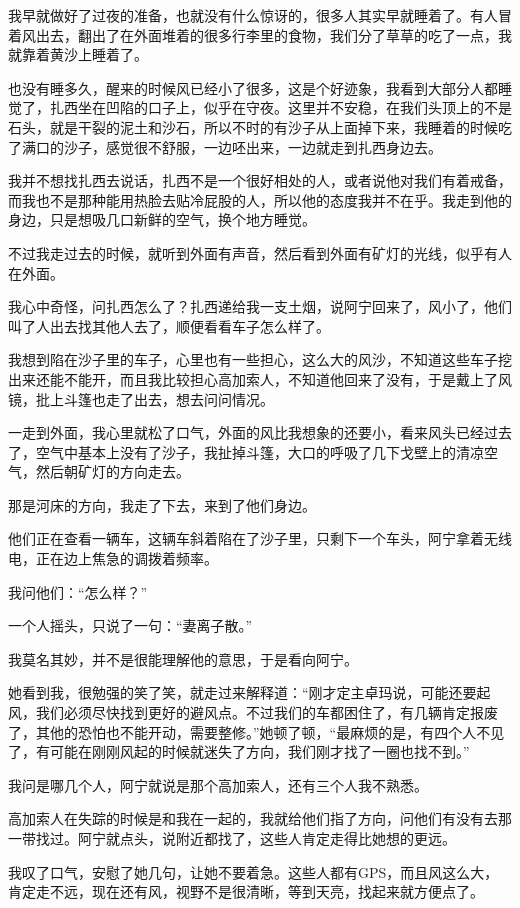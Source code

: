 我早就做好了过夜的准备，也就没有什么惊讶的，很多人其实早就睡着了。有人冒着风出去，翻出了在外面堆着的很多行李里的食物，我们分了草草的吃了一点，我就靠着黄沙上睡着了。

也没有睡多久，醒来的时候风已经小了很多，这是个好迹象，我看到大部分人都睡觉了，扎西坐在凹陷的口子上，似乎在守夜。这里并不安稳，在我们头顶上的不是石头，就是干裂的泥土和沙石，所以不时的有沙子从上面掉下来，我睡着的时候吃了满口的沙子，感觉很不舒服，一边呸出来，一边就走到扎西身边去。

我并不想找扎西去说话，扎西不是一个很好相处的人，或者说他对我们有着戒备，而我也不是那种能用热脸去贴冷屁股的人，所以他的态度我并不在乎。我走到他的身边，只是想吸几口新鲜的空气，换个地方睡觉。

不过我走过去的时候，就听到外面有声音，然后看到外面有矿灯的光线，似乎有人在外面。

我心中奇怪，问扎西怎么了？扎西递给我一支土烟，说阿宁回来了，风小了，他们叫了人出去找其他人去了，顺便看看车子怎么样了。

我想到陷在沙子里的车子，心里也有一些担心，这么大的风沙，不知道这些车子挖出来还能不能开，而且我比较担心高加索人，不知道他回来了没有，于是戴上了风镜，批上斗篷也走了出去，想去问问情况。

一走到外面，我心里就松了口气，外面的风比我想象的还要小，看来风头已经过去了，空气中基本上没有了沙子，我扯掉斗篷，大口的呼吸了几下戈壁上的清凉空气，然后朝矿灯的方向走去。

那是河床的方向，我走了下去，来到了他们身边。

他们正在查看一辆车，这辆车斜着陷在了沙子里，只剩下一个车头，阿宁拿着无线电，正在边上焦急的调拨着频率。

我问他们：“怎么样？”

一个人摇头，只说了一句：“妻离子散。”

我莫名其妙，并不是很能理解他的意思，于是看向阿宁。

她看到我，很勉强的笑了笑，就走过来解释道：“刚才定主卓玛说，可能还要起风，我们必须尽快找到更好的避风点。不过我们的车都困住了，有几辆肯定报废了，其他的恐怕也不能开动，需要整修。”她顿了顿，“最麻烦的是，有四个人不见了，有可能在刚刚风起的时候就迷失了方向，我们刚才找了一圈也找不到。”

我问是哪几个人，阿宁就说是那个高加索人，还有三个人我不熟悉。

高加索人在失踪的时候是和我在一起的，我就给他们指了方向，问他们有没有去那一带找过。阿宁就点头，说附近都找了，这些人肯定走得比她想的更远。

我叹了口气，安慰了她几句，让她不要着急。这些人都有GPS，而且风这么大，肯定走不远，现在还有风，视野不是很清晰，等到天亮，找起来就方便点了。

